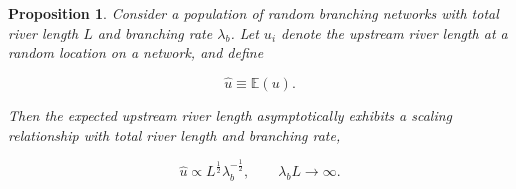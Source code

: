 \documentclass[11pt, class=article, crop=false]{standalone}
\newtheorem{proposition}{Proposition}[subsection]
\theoremstyle{definition}
\begin{document}
\begin{proposition}
\label{proposition-u}
Consider a population of random branching networks with total river length $L$ and branching rate $\lambda_b$.
Let $u_i$ denote the upstream river length at a random location on a network, and define

\begin{equation}
    \hat{u} \equiv \mathbb{E}(u).
\end{equation}

Then the expected upstream river length asymptotically exhibits a scaling relationship with total river length and branching rate,

\begin{equation}
\hat{u} \propto L^{\frac{1}{2}} \lambda_b^{-\frac{1}{2}}, \qquad \lambda_bL \rightarrow \infty.
\end{equation}

\end{proposition}
\end{document}
